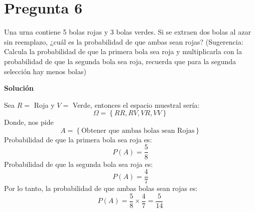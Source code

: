 \documentclass[11pt]{article}
\begin{document}
	\section{Pregunta 6}
	Una urna contiene 5 bolas rojas y 3 bolas verdes. Si se extraen dos bolas al azar sin reemplazo, ¿cuál es la probabilidad de que ambas sean rojas? (Sugerencia: Calcula la probabilidad de que la primera bola sea roja y multiplicarla con la probabilidad de que la segunda bola sea roja, recuerda que para la segunda selección hay menos bolas)
		\begin{center}
			\textbf{Solución}
		\end{center}
	Sea $R = $ Roja y $V = $ Verde, entonces el espacio muestral sería:
	\begin{equation}
		\Omega = \left \{RR,RV,VR,VV\right\}
	\end{equation}
 	Donde, nos pide
 	\begin{equation}
 		A = \left \{\text{Obtener que ambas bolas sean Rojas}\right\}
 	\end{equation}
	Probabilidad de que la primera bola sea roja es:
	\begin{equation}
		P(A ) = \dfrac{5}{8}
	\end{equation}
	 Probabilidad de que la segunda bola sea roja es:
	\begin{equation}
		P(A ) = \dfrac{4}{7}
	\end{equation}
	Por lo tanto, la probabilidad de que ambas bolas sean rojas es:
	\begin{equation}
		P(A ) = \dfrac{5}{8}\times\dfrac{4}{7}  = \dfrac{5}{14}
	\end{equation}
\end{document}
